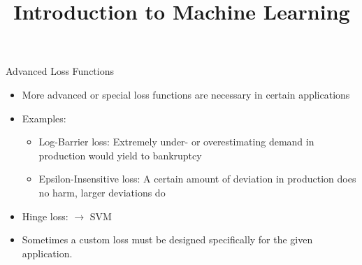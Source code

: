 




\newcommand{\titlefigure}{figure_man/optimization_steps.jpeg}
\newcommand{\learninggoals}{
  \item Know the Log-Barrier loss
  \item Know the Epsilon-Insensitive loss
  \item Know the Quantile Loss
}

\title{Introduction to Machine Learning}
\date{}





\begin{vbframe}{Advanced Loss Functions}
\begin{itemize}
\item More advanced or special loss functions are necessary in certain applications
\item Examples:
\begin{itemize}
\item Log-Barrier loss: Extremely under- or overestimating demand in production would yield to bankruptcy
\item Epsilon-Insensitive loss: A certain amount of deviation in production does no harm, larger deviations do
\end{itemize}
\item Hinge loss: $\rightarrow$ SVM
\item Sometimes a custom loss must be designed specifically for the given application.
\end{itemize}
\end{vbframe}


